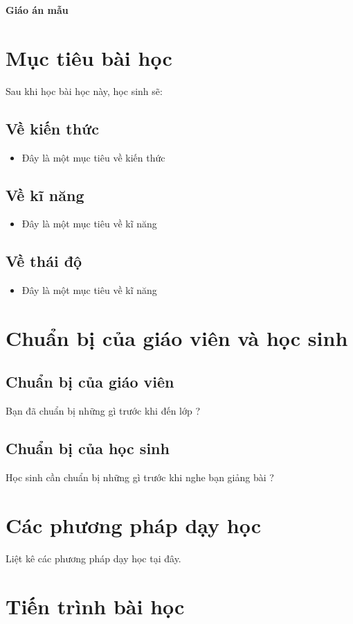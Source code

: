 \documentclass[12pt,a4paper]{article}
\author{Vũ Ngọc Binh}
\begin{document}
	\begin{center}
		\textbf{\LARGE Giáo án mẫu}
	\end{center}
	\section{Mục tiêu bài học}
	Sau khi học bài học này, học sinh sẽ:
	\subsection{Về kiến thức}
	\begin{itemize}
		\item Đây là một mục tiêu về kiến thức
	\end{itemize}
	\subsection{Về kĩ năng}
	\begin{itemize}
		\item Đây là một mục tiêu về kĩ năng
	\end{itemize}
	\subsection{Về thái độ}
	\begin{itemize}
		\item Đây là một mục tiêu về kĩ năng
	\end{itemize}
	\section{Chuẩn bị của giáo viên và học sinh}
	\subsection{Chuẩn bị của giáo viên}
	Bạn đã chuẩn bị những gì trước khi đến lớp ?
	\subsection{Chuẩn bị của học sinh}
	Học sinh cần chuẩn bị những gì trước khi nghe bạn giảng bài ?
	\section{Các phương pháp dạy học}
	Liệt kê các phương pháp dạy học tại đây.
	\section{Tiến trình bài học}
\end{document}
